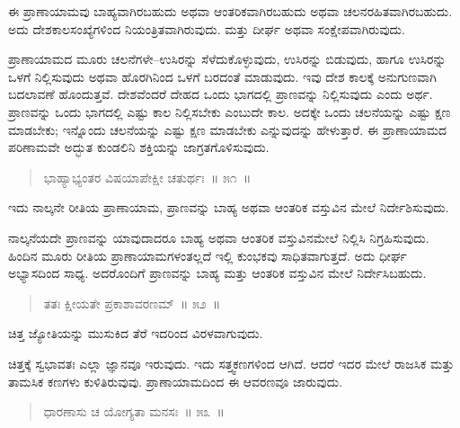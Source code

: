 \vspace{-0.3cm}

ಈ ಪ್ರಾಣಾಯಾಮವು ಬಾಹ್ಯವಾಗಿರಬಹುದು ಅಥವಾ ಆಂತರಿಕವಾಗಿರಬಹುದು ಅಥವಾ ಚಲನರಹಿತವಾಗಿರಬಹುದು. ಅದು ದೇಶಕಾಲಸಂಖ್ಯೆಗಳಿಂದ ನಿಯಂತ್ರಿತವಾಗಿರುವುದು. ಮತ್ತು ದೀರ್ಘ ಅಥವಾ ಸಂಕ್ಷೇಪವಾಗಿರುವುದು. 

ಪ್ರಾಣಾಯಾಮದ ಮೂರು ಚಲನೆಗಳೇ–ಉಸಿರನ್ನು ಸೆಳೆದುಕೊಳ್ಳುವುದು, ಉಸಿರನ್ನು ಬಿಡುವುದು, ಹಾಗೂ ಉಸಿರನ್ನು ಒಳಗೆ ನಿಲ್ಲಿಸುವುದು ಅಥವಾ ಹೊರಗಿನಿಂದ ಒಳಗೆ ಬರದಂತೆ ಮಾಡುವುದು. ಇವು ದೇಶ ಕಾಲಕ್ಕೆ ಅನುಗುಣವಾಗಿ ಬದಲಾವಣೆ ಹೊಂದುತ್ತವೆ. ದೇಶವೆಂದರೆ ದೇಹದ ಒಂದು ಭಾಗದಲ್ಲಿ ಪ್ರಾಣವನ್ನು ನಿಲ್ಲಿಸುವುದು ಎಂದು ಅರ್ಥ. ಪ್ರಾಣವನ್ನು ಒಂದು ಭಾಗದಲ್ಲಿ ಎಷ್ಟು ಕಾಲ ನಿಲ್ಲಿಸಬೇಕು ಎಂಬುದೇ ಕಾಲ. ಅದಕ್ಕೇ ಒಂದು ಚಲನೆಯನ್ನು ಎಷ್ಟು ಕ್ಷಣ ಮಾಡಬೇಕು; ಇನ್ನೊಂದು ಚಲನೆಯನ್ನು ಎಷ್ಟು ಕ್ಷಣ ಮಾಡಬೇಕು ಎನ್ನುವುದನ್ನು ಹೇಳುತ್ತಾರೆ. ಈ ಪ್ರಾಣಾಯಾಮದ ಪರಿಣಾಮವೇ ಅದ್ಭುತ ಕುಂಡಲಿನಿ ಶಕ್ತಿಯನ್ನು ಜಾಗ್ರತಗೊಳಿಸುವುದು. 

\vspace{-0.3cm}

\begin{verse}
ಭಾಹ್ಯಾಭ್ಯಂತರ ವಿಷಯಾಪೇಕ್ಷೀ ಚತುರ್ಥಃ~॥ ೫೧~॥
\end{verse}

\vspace{-0.3cm}

ಇದು ನಾಲ್ಕನೇ ರೀತಿಯ ಪ್ರಾಣಾಯಾಮ, ಪ್ರಾಣವನ್ನು ಬಾಹ್ಯ ಅಥವಾ ಆಂತರಿಕ ವಸ್ತುವಿನ ಮೇಲೆ ನಿರ್ದೇಶಿಸುವುದು. 

ನಾಲ್ಕನೆಯದೇ ಪ್ರಾಣವನ್ನು ಯಾವುದಾದರೂ ಬಾಹ್ಯ ಅಥವಾ ಆಂತರಿಕ ವಸ್ತುವಿನಮೇಲೆ ನಿಲ್ಲಿಸಿ ನಿಗ್ರಹಿಸುವುದು. ಹಿಂದಿನ ಮೂರು ರೀತಿಯ ಪ್ರಾಣಾಯಾಮಗಳಂತಲ್ಲದೆ ಇಲ್ಲಿ ಕುಂಭಕವು ಸಾಧಿತವಾಗುತ್ತದೆ. ಅದು ಧೀರ್ಘ ಅಭ್ಯಾಸದಿಂದ ಸಾಧ್ಯ. ಅದರೊಂದಿಗೆ ಪ್ರಾಣವನ್ನು ಬಾಹ್ಯ ಮತ್ತು ಆಂತರಿಕ ವಸ್ತುವಿನ ಮೇಲೆ ನಿರ್ದೇಸಿಬಹುದು. 

\vspace{-0.3cm}

\begin{verse}
ತತಃ ಕ್ಷೀಯತೇ ಪ್ರಕಾಶಾವರಣಮ್​~॥ ೫೨~॥
\end{verse}

\vspace{-0.3cm}

ಚಿತ್ತ ಜ್ಯೋತಿಯನ್ನು ಮುಸುಕಿದ ತೆರೆ ಇದರಿಂದ ವಿರಳವಾಗುವುದು. 

ಚಿತ್ತಕ್ಕೆ ಸ್ವಭಾವತಃ ಎಲ್ಲಾ ಜ್ಞಾನವೂ ಇರುವುದು. ಇದು ಸತ್ತ್ವಕಣಗಳಿಂದ ಆಗಿದೆ. ಆದರೆ ಇದರ ಮೇಲೆ ರಾಜಸಿಕ ಮತ್ತು ತಾಮಸಿಕ ಕಣಗಳು ಕುಳಿತಿರುವುವು. ಪ್ರಾಣಾಯಾಮದಿಂದ ಈ ಆವರಣವೂ ಜಾರುವುದು. 

\vspace{-0.3cm}

\begin{verse}
ಧಾರಣಾಸು ಚ ಯೋಗ್ಯತಾ ಮನಸಃ~॥ ೫೩~॥
\end{verse}

\vspace{-0.3cm}

